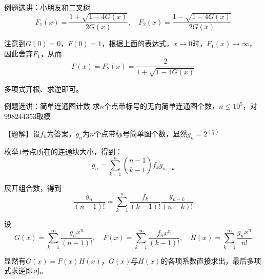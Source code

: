 \documentclass{beamer}
\begin{document}
\begin{frame}{例题选讲：小朋友和二叉树}
    \small
    \begin{equation*}
        F_1(x)=\frac{1+ \sqrt{1-4G(x)}}{2G(x)},\quad F_2(x)=\frac{1- \sqrt{1-4G(x)}}{2G(x)}
    \end{equation*}

    注意到$G(0)=0$，$F(0)=1$，根据上面的表达式，$x\to 0$时，$F_1(x)\to \infty$，因此舍弃$F_1$\pause ，从而
    \begin{equation*}
        F(x)=F_2(x)=\frac{2}{1+ \sqrt{1-4G(x)}}
    \end{equation*}

    多项式开根、求逆即可。
\end{frame}

\begin{frame}{例题选讲：简单连通图计数}
    \small
    求$n$个点带标号的无向简单连通图个数，$n\leq 10^5$，对$998244353$取模

    \vspace{1em}\pause
    【题解】设$f_n$为答案，$g_n$为$n$个点带标号简单图个数，显然$g_n=2^{\binom{n}{2}}$

    \pause
    枚举$1$号点所在的连通块大小，得到：
    \begin{equation*}
        g_n=\sum_{k=1}^n \binom{n-1}{k-1}f_k g_{n-k}
    \end{equation*}

    \pause
    展开组合数，得到
    \begin{equation*}
        \frac{g_n}{(n-1)!}=\sum_{k=1}^n \frac{f_k}{(k-1)!} \frac{g_{n-k}}{(n-k)!}
    \end{equation*}

    \pause
    设
    \begin{equation*}
        G(x)=\sum_{k=1}^\infty \frac{g_n x^n}{(n-1)!},\quad F(x)=\sum_{k=1}^\infty \frac{f_n x^n}{(k-1)!},\quad H(x)=\sum_{k=1}^\infty \frac{g_n x^n}{n!}
    \end{equation*}

    显然有$G(x)=F(x)H(x)$，$G(x)$与$H(x)$的各项系数直接求出，最后多项式求逆即可。
\end{frame}
\end{document}
